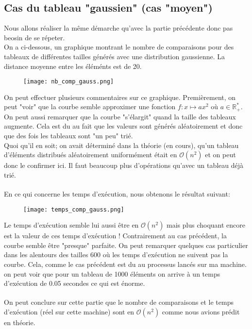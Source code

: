 \documentclass[a4paper,12pt]{article}
\begin{document}
\subsection{Cas du tableau "gaussien" (cas "moyen")}
Nous allons réaliser la même démarche qu'avec la partie précédente donc pas beosin de se répeter. \\
On a ci-dessous, un graphique montrant le nombre de comparaisons pour des tableaux de différentes tailles générés avec une distribution gaussienne. La distance moyenne entre les éléménts est de 20. 
\newpage
\begin{figure}[!h]
  \centering
  \texttt{[image: nb\_comp\_gauss.png]}
\end{figure}
On peut effectuer plusieurs commentaires sur ce graphique. Premièrement, on peut "voir" que la courbe semble approximer une fonction  $f:x \mapsto ax^2$ où $a \in \mathbb{R}^*_+$. On peut aussi remarquer que la courbe "s'élargit" quand la taille des tableaux augmente. Cela est du au fait que les valeurs sont générés aléatoirement et donc que des fois les tableaux sont "un peu" trié. \\
Quoi qu'il en soit; on avait déterminé dans la théorie (en cours), qu'un tableau d'éléments distribués aléatoirement uniformément était en $\mathcal{O}(n^2)$ et on peut donc le confirmer ici. Il faut beaucoup plus d'opérations qu'avec un tableau déjà trié. \\ \\
En ce qui concerne les temps d'exécution, nous obtenons le résultat suivant:
\newpage
\begin{figure}[!h]
  \centering
  \texttt{[image: temps\_comp\_gauss.png]}
\end{figure}
Le temps d'exécution semble lui aussi être en $\mathcal{O}(n^2)$ mais plus choquant encore est la valeur de ces temps d'exécution ! Contrairement au cas précédent, la courbe semble être "presque" parfaite. On peut remarquer quelques cas particulier dans les alentours des tailles 600 où les temps d'exécution ne suivent pas la courbe. Cela, comme le cas précédent est du au processus lancés sur ma machine. on peut voir que pour un tableau de 1000 éléments on arrive à un temps d'exécution de 0.05 secondes ce qui est énorme. \\ \\
On peut conclure sur cette partie que le nombre de comparaisons et le temps d'exécution (réel sur cette machine) sont en $\mathcal{O}(n^2)$ comme nous avions prédit en théorie. 
\end{document}
